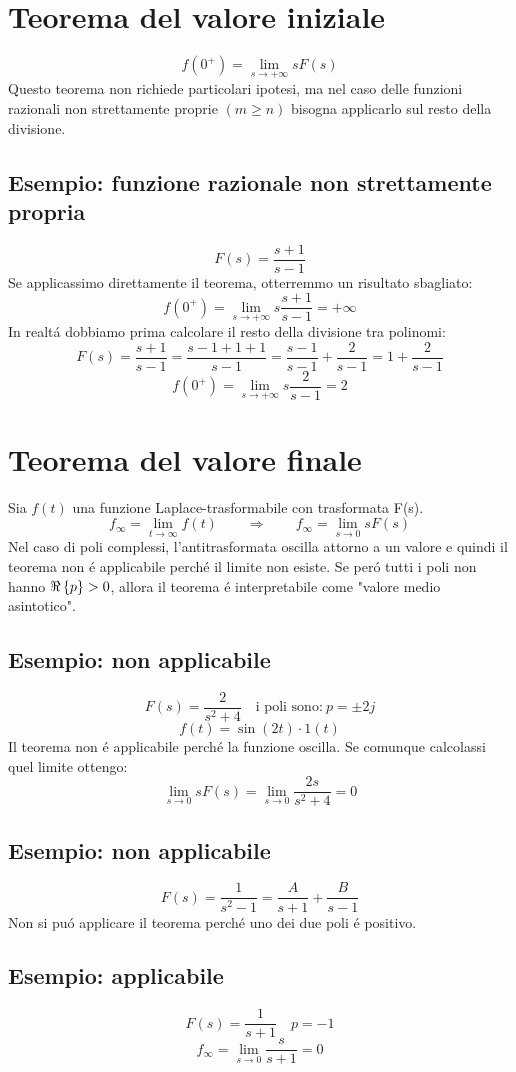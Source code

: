 \documentclass[../main.tex]{subfiles}
\begin{document}
	\section{Teorema del valore iniziale}
	\[ f(0^+) = \lim\limits_{s \rightarrow +\infty} s F(s) \]
	Questo teorema non richiede particolari ipotesi, ma nel caso delle funzioni razionali non strettamente proprie $ (m \geq n) $ bisogna applicarlo sul resto della divisione.
	\subsection{Esempio: funzione razionale non strettamente propria}
	\[ F(s) = \frac{s+1}{s-1} \]
	Se applicassimo direttamente il teorema, otterremmo un risultato sbagliato:
	\[ f(0^+) = \lim\limits_{s \rightarrow +\infty}s \frac{s+1}{s-1} = +\infty \]
	In realt\'{a} dobbiamo prima calcolare il resto della divisione tra polinomi:
	\[ F(s) = \frac{s+1}{s-1} = \frac{s-1+1+1}{s-1} = \frac{s-1}{s-1} + \frac{2}{s-1} = 1 + \frac{2}{s-1} \]
	\[ f(0^+) = \lim\limits_{s \rightarrow +\infty} s \frac{2}{s-1} = 2 \]
	\section{Teorema del valore finale}
	Sia $ f(t) $ una funzione Laplace-trasformabile con trasformata F(s).\\
	\[ f_\infty = \lim\limits_{t \rightarrow \infty} f(t) \qquad \Rightarrow \qquad f_\infty = \lim\limits_{s \rightarrow 0} s F(s) \]
	Nel caso di poli complessi, l'antitrasformata oscilla attorno a un valore e quindi il teorema non \'{e} applicabile perch\'{e} il limite non esiste. Se per\'{o} tutti i poli non hanno $ \Re \left\lbrace p \right\rbrace > 0 $, allora il teorema \'{e} interpretabile come "valore medio asintotico".
	\subsection{Esempio: non applicabile}
	\[ F(s) = \frac{2}{s^2+4} \quad \text{i poli sono:}\ p = \pm 2j \]
	\[ f(t) = \sin(2t) \cdot 1(t) \]
	Il teorema non \'{e} applicabile perch\'{e} la funzione oscilla. Se comunque calcolassi quel limite ottengo:
	\[ \lim\limits_{s \rightarrow 0} s F(s) = \lim\limits_{s \rightarrow 0} \frac{2s}{s^2 + 4} = 0 \]
	\subsection{Esempio: non applicabile}
	\[ F(s) = \frac{1}{s^2-1} = \frac{A}{s+1} + \frac{B}{s-1} \]
	Non si pu\'{o} applicare il teorema perch\'{e} uno dei due poli \'{e} positivo.
	\subsection{Esempio: applicabile}
	\[ F(s) = \frac{1}{s+1} \quad p = -1 \]
	\[ f_\infty = \lim\limits_{s \rightarrow 0} \frac{s}{s+1} = 0 \]
	
\end{document}
